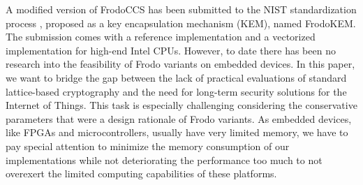A modified version of \textsf{FrodoCCS} \cite{DBLP:conf/ccs/BosCDMNNRS16} has been submitted to the NIST standardization process \cite{frodo-nist}, proposed as a key encapsulation mechanism (KEM), named \textsf{FrodoKEM}. The submission comes with a reference implementation and a vectorized implementation for high-end Intel CPUs. However, to date there has been no research into the feasibility of \textsf{Frodo} variants on embedded devices. In this paper, we want to bridge the gap between the lack of practical evaluations of standard lattice-based cryptography and the need for long-term security solutions for the Internet of Things. This task is especially challenging considering the conservative parameters that were a design rationale of \textsf{Frodo} variants. As embedded devices, like FPGAs and microcontrollers, usually have very limited memory, we have to pay special attention to minimize the memory consumption of our implementations while not deteriorating the performance too much to not overexert the limited computing capabilities of these platforms.






